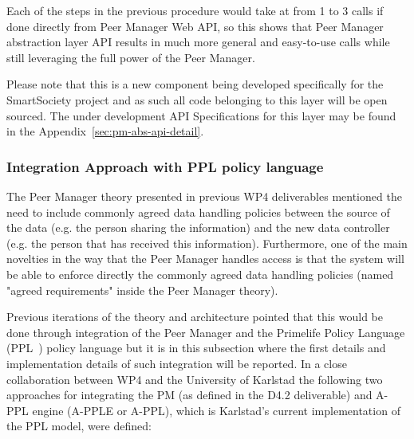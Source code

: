 Each of the steps in the previous procedure would take at from 1 to 3 calls if done directly from Peer Manager Web API, so this shows that Peer Manager abstraction layer API results in much more general and easy-to-use calls while still leveraging the full power of the Peer Manager.

Please note that this is a new component being developed specifically for the SmartSociety project and as such all code belonging to this layer will be open sourced. The under development API Specifications for this layer may be found in the Appendix~\ref{sec:pm-abs-api-detail}.

\subsubsection{Integration Approach with PPL policy language}

The Peer Manager theory presented in previous WP4 deliverables mentioned the need to include commonly agreed data handling policies between the source of the data (e.g. the person sharing the information) and the new data controller (e.g. the person that has received this information). Furthermore, one of the main novelties in the way that the Peer Manager handles access is that the system will be able to enforce directly the commonly agreed data handling policies (named "agreed requirements" inside the Peer Manager theory).

Previous iterations of the theory and architecture pointed that this would be done through integration of the Peer Manager and the Primelife Policy Language (PPL~\cite{PrimeLife534}) policy language but it is in this subsection where the first details and implementation details of such integration will be reported. 
In a close collaboration between WP4 and the University of Karlstad the following two approaches for integrating the PM (as defined in the D4.2 deliverable) and A-PPL engine (A-PPLE or A-PPL), which is Karlstad's current implementation of the PPL model, were defined:

